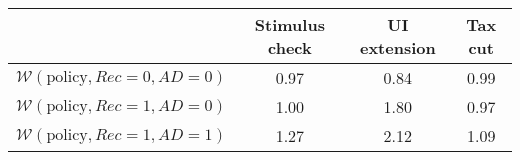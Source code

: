 \begin{tabular}{@{}lccc@{}} 
\toprule 
                          & Stimulus check      & UI extension    & Tax cut    \\  \midrule 
$\mathcal{W}(\text{policy}, Rec=0, AD=0)$ & 0.97  & 0.84  & 0.99     \\ 
$\mathcal{W}(\text{policy}, Rec=1, AD=0)$ & 1.00  & 1.80  & 0.97     \\ 
$\mathcal{W}(\text{policy}, Rec=1, AD=1)$ & 1.27  & 2.12  & 1.09     \\ \bottomrule 
\end{tabular}  
